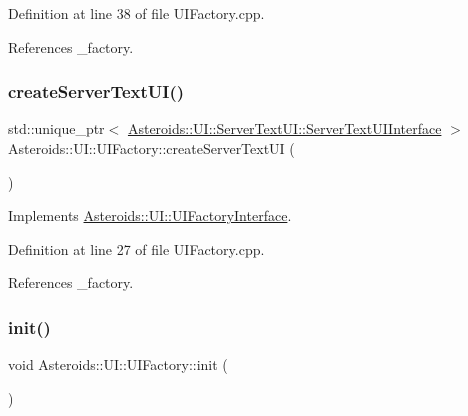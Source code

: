 Definition at line 38 of file U\+I\+Factory.\+cpp.



References \+\_\+factory.

\mbox{\label{classAsteroids_1_1UI_1_1UIFactory_abee314a786ce6f30022c008755e71805}} 
\subsubsection{\texorpdfstring{create\+Server\+Text\+U\+I()}{createServerTextUI()}}
{\footnotesize\ttfamily std\+::unique\+\_\+ptr$<$ \hyperlink{classAsteroids_1_1UI_1_1ServerTextUI_1_1ServerTextUIInterface}{Asteroids\+::\+U\+I\+::\+Server\+Text\+U\+I\+::\+Server\+Text\+U\+I\+Interface} $>$ Asteroids\+::\+U\+I\+::\+U\+I\+Factory\+::create\+Server\+Text\+UI (\begin{DoxyParamCaption}{ }\end{DoxyParamCaption})\hspace{0.3cm}{\ttfamily [virtual]}}



Implements \hyperlink{classAsteroids_1_1UI_1_1UIFactoryInterface_a830fa72105e7f123146383330f2fa8b9}{Asteroids\+::\+U\+I\+::\+U\+I\+Factory\+Interface}.



Definition at line 27 of file U\+I\+Factory.\+cpp.



References \+\_\+factory.

\mbox{\label{classAsteroids_1_1UI_1_1UIFactory_a4b3a29aad342a46b3ab713ca402095b6}} 
\subsubsection{\texorpdfstring{init()}{init()}}
{\footnotesize\ttfamily void Asteroids\+::\+U\+I\+::\+U\+I\+Factory\+::init (\begin{DoxyParamCaption}{ }\end{DoxyParamCaption})\hspace{0.3cm}{\ttfamily [private]}}

